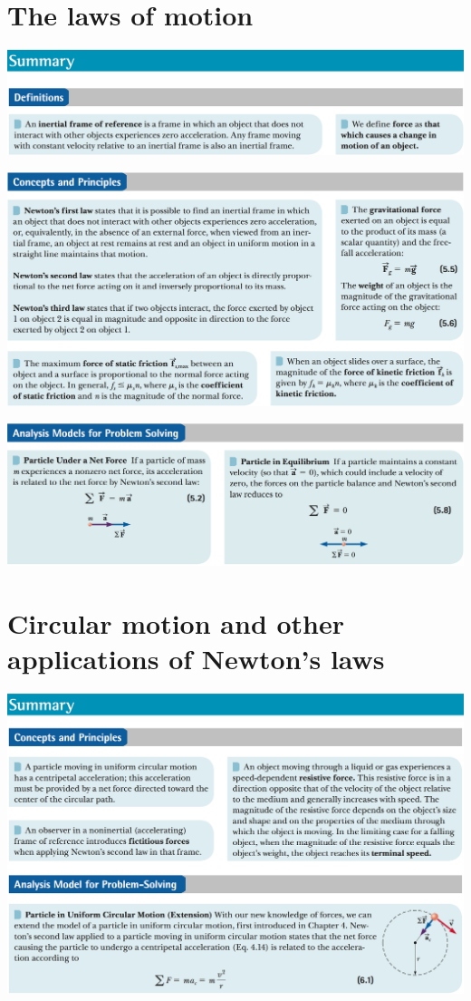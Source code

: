 \documentclass[12pt,a4paper]{article}
\newcommand{\N}{\noindent}
\begin{document}
	\section{The laws of motion}
		\N \includegraphics[scale=.42]{5_a.png}
		
		\vspace{2mm}
		\N \includegraphics[scale=.42]{5_b.png}
		
		\vspace{2mm}
		\N \includegraphics[scale=.42]{5_c.png}
		
	\section{Circular motion and other applications of Newton’s laws}
		\N \includegraphics[scale=.42]{6.png}
\end{document}
